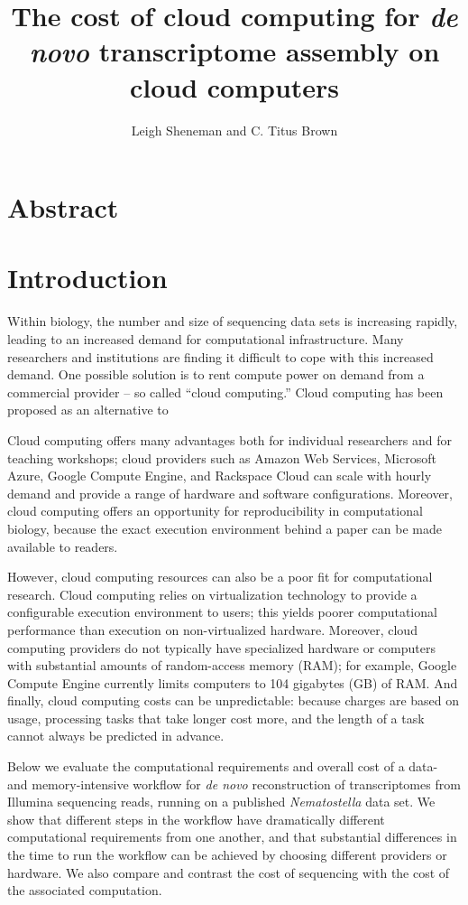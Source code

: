 \documentclass[11pt]{article}
\begin{document}
\title{The cost of cloud computing for {\em de novo} transcriptome assembly on cloud computers}
\author{Leigh Sheneman and C. Titus Brown}
\maketitle

\section*{Abstract}

\section*{Introduction}

Within biology, the number and size of sequencing data sets is increasing
rapidly, leading to an increased demand for computational infrastructure.
Many researchers and institutions are finding it difficult to cope with
this increased demand.  One possible solution is to rent compute power
on demand from a commercial provider -- so called ``cloud computing.''
Cloud computing has been proposed as an alternative to 

Cloud computing offers many advantages both for individual researchers
and for teaching workshops; cloud providers such as Amazon Web
Services, Microsoft Azure, Google Compute Engine, and Rackspace Cloud
can scale with hourly demand and provide a range of hardware and
software configurations.  Moreover, cloud computing offers an
opportunity for reproducibility in computational biology, because
the exact execution environment behind a paper can be made available
to readers.

However, cloud computing resources can also be a poor fit for
computational research.  Cloud computing relies on virtualization
technology to provide a configurable execution environment to users;
this yields poorer computational performance than execution on
non-virtualized hardware.  Moreover, cloud computing providers do
not typically have specialized hardware or computers with substantial
amounts of random-access memory (RAM); for example, Google Compute
Engine currently limits computers to 104 gigabytes (GB) of RAM.
And finally, cloud computing costs can be unpredictable: because
charges are based on usage, processing tasks that take longer cost more,
and the length of a task cannot always be predicted in advance.

Below we evaluate the computational requirements and overall cost of a
data- and memory-intensive workflow for {\em de novo} reconstruction
of transcriptomes from Illumina sequencing reads, running on a
published {\em Nematostella} data set.  We show that different steps
in the workflow have dramatically different computational requirements
from one another, and that substantial differences in the time to run
the workflow can be achieved by choosing different providers or hardware.
We also compare and contrast the cost of sequencing with the cost of the
associated computation.
\end{document}
